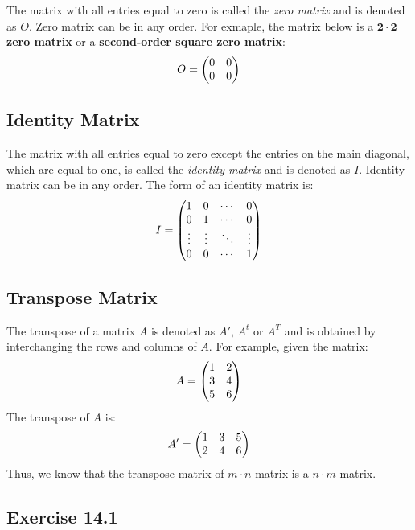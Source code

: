 \documentclass{report}
\begin{document}
\begin{multicols}{2}
  \doublespacing{}

  The matrix with all entries equal to zero is called the \emph{zero matrix} and
  is denoted as $O$. Zero matrix can be in any order. For exmaple, the matrix
  below is a \textbf{$\mathbf{2 \cdot 2}$ zero matrix} or a \textbf{second-order
    square zero matrix}:
  \[
    O = \begin{pmatrix}
      0 & 0 \\
      0 & 0
    \end{pmatrix}
  \]

  \singlespacing{}

  \subsection*{Identity Matrix}

  \doublespacing{}

  The matrix with all entries equal to zero except the entries on the main
  diagonal, which are equal to one, is called the \emph{identity matrix} and is
  denoted as $I$. Identity matrix can be in any order. The form of an identity
  matrix is:
  \[
    I = \begin{pmatrix}
      1      & 0      & \cdots & 0      \\
      0      & 1      & \cdots & 0      \\
      \vdots & \vdots & \ddots & \vdots \\
      0      & 0      & \cdots & 1
    \end{pmatrix}
  \]

  \singlespacing{}

  \subsection*{Transpose Matrix}

  \doublespacing{}

  The transpose of a matrix $A$ is denoted as $A'$, $A^t$ or $A^T$ and is
  obtained by interchanging the rows and columns of $A$. For example, given the
  matrix:
  \[
    A = \begin{pmatrix}
      1 & 2 \\
      3 & 4 \\
      5 & 6
    \end{pmatrix}
  \]
  The transpose of $A$ is:
  \[
    A' = \begin{pmatrix}
      1 & 3 & 5 \\
      2 & 4 & 6
    \end{pmatrix}
  \]
  Thus, we know that the transpose matrix of $m \cdot n$ matrix is a $n \cdot m$
  matrix.

  \singlespacing{}

  \subsection{Exercise 14.1}


\end{multicols}
\end{document}
